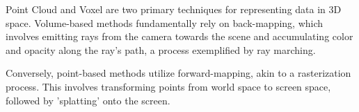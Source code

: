 Point Cloud and Voxel are two primary techniques for representing data in 3D space. Volume-based methods fundamentally rely on back-mapping, which involves emitting rays from the camera towards the scene and accumulating color and opacity along the ray's path, a process exemplified by ray marching. 

Conversely, point-based methods utilize forward-mapping, akin to a rasterization process. This involves transforming points from world space to screen space, followed by 'splatting' onto the screen.
